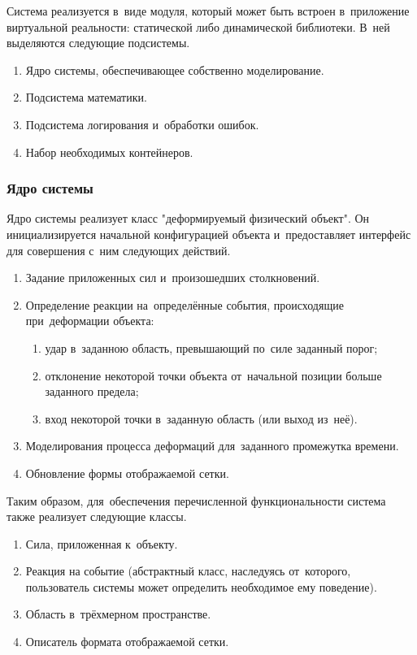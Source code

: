\documentclass[a4paper, 14pt, titlepage]{extarticle}
\begin{document}
      Система реализуется в~виде модуля, который может быть встроен в~приложение виртуальной
      реальности: статической либо динамической библиотеки. В~ней выделяются следующие подсистемы.
      \begin{enumerate}
        \item Ядро системы, обеспечивающее собственно моделирование.
        \item Подсистема математики.
        \item Подсистема логирования и~обработки ошибок.
        \item Набор необходимых контейнеров.
      \end{enumerate}

      \subsubsection{Ядро системы}
        
        Ядро системы реализует класс "деформируемый физический объект". Он инициализируется
        начальной конфигурацией объекта и~предоставляет интерфейс для совершения с~ним следующих действий.
        \begin{enumerate}
          \item Задание приложенных сил и~произошедших столкновений.
          \item Определение реакции на~определённые события, происходящие при~деформации объекта:
            \begin{enumerate}
              \item удар в~заданною область, превышающий по~силе заданный порог;
              \item отклонение некоторой точки объекта от~начальной позиции больше заданного предела;
              \item вход некоторой точки в~заданную область (или выход из~неё).
            \end{enumerate}
          \item Моделирования процесса деформаций для~заданного промежутка времени.
          \item Обновление формы отображаемой сетки.
        \end{enumerate}

        Таким образом, для~обеспечения перечисленной функциональности система также реализует следующие классы.
        \begin{enumerate}
          \item Сила, приложенная к~объекту.
          \item Реакция на событие (абстрактный класс, наследуясь от~которого, пользователь системы
            может определить необходимое ему поведение).
          \item Область в~трёхмерном пространстве.
          \item Описатель формата отображаемой сетки.
        \end{enumerate}
\end{document}
